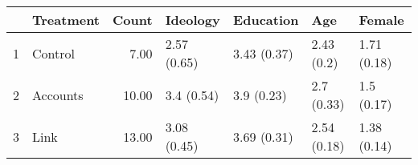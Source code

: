 \begin{table}[ht]
\centering
\begin{tabular}{rlrllll}
  \hline
 & Treatment & Count & Ideology & Education & Age & Female \\ 
  \hline
1 & Control & 7.00 & 2.57 (0.65) & 3.43 (0.37) & 2.43 (0.2) & 1.71 (0.18) \\ 
  2 & Accounts & 10.00 & 3.4 (0.54) & 3.9 (0.23) & 2.7 (0.33) & 1.5 (0.17) \\ 
  3 & Link & 13.00 & 3.08 (0.45) & 3.69 (0.31) & 2.54 (0.18) & 1.38 (0.14) \\ 
   \hline
\end{tabular}
\end{table}
